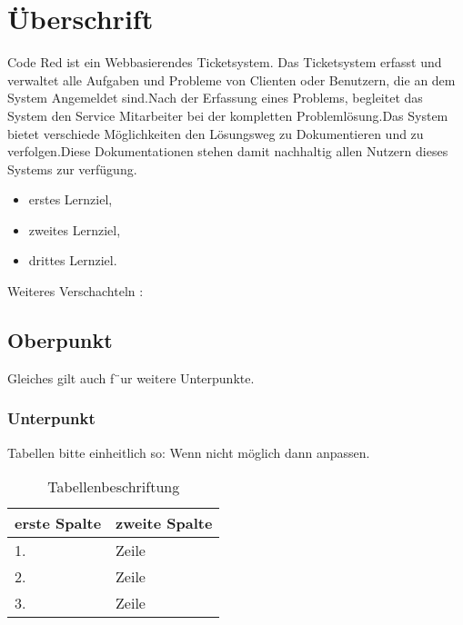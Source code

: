 \chapter{Überschrift}  %
\label{chapter:Überschrift}  %

Code Red ist ein Webbasierendes Ticketsystem. Das Ticketsystem erfasst und verwaltet alle Aufgaben und Probleme von Clienten oder Benutzern, die an dem System Angemeldet sind.Nach der Erfassung eines Problems, begleitet das System den Service Mitarbeiter bei der kompletten Problemlösung.Das System bietet verschiede Möglichkeiten den Lösungsweg zu Dokumentieren und zu verfolgen.Diese Dokumentationen stehen damit nachhaltig allen Nutzern dieses Systems zur verfügung.

 
\begin{itemize}
\item erstes Lernziel,
\item zweites Lernziel,
\item drittes Lernziel.
\end{itemize}

Weiteres Verschachteln :

\section{Oberpunkt}
\label{section:Oberpunkt}

Gleiches gilt auch f¨ur weitere Unterpunkte.

\subsection{Unterpunkt}
\label{subsection:Unterpunkt}


Tabellen bitte einheitlich so:
Wenn nicht möglich dann anpassen.

\begin{table}[htbp]
\begin{center}
\begin{tabular*}{0.95\textwidth}{p{}p{}}
\hline
\textbf{erste Spalte} & \textbf{zweite Spalte} \\
\hline
1. & Zeile \\
2. & Zeile \\
3. & Zeile \\
\hline
\end{tabular*}
\caption{Tabellenbeschriftung}
\label{table:Tabellenbeschriftung}
\end{center}
\end{table}



